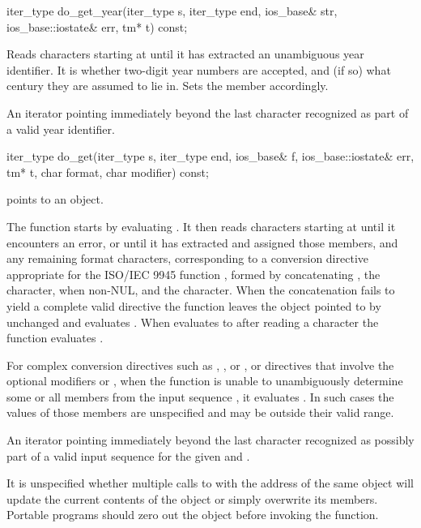 %
\begin{itemdecl}
iter_type do_get_year(iter_type s, iter_type end, ios_base& str,
                      ios_base::iostate& err, tm* t) const;
\end{itemdecl}

\begin{itemdescr}
\pnum
\effects
Reads characters starting at 
until it has extracted an unambiguous year identifier.
It is
 whether
two-digit year numbers are accepted,
and (if so) what century they are assumed to lie in.
Sets the
member accordingly.

\pnum
\returns
An iterator pointing immediately beyond the last character recognized
as part of a valid year identifier.
\end{itemdescr}

%
\begin{itemdecl}
iter_type do_get(iter_type s, iter_type end, ios_base& f,
                 ios_base::iostate& err, tm* t, char format, char modifier) const;
\end{itemdecl}

\begin{itemdescr}
\pnum
\expects
{} points to an object.

\pnum
\effects
The function starts by evaluating
. It
then reads characters starting at  until it encounters an error, or
until it has extracted and assigned those  members, and any
remaining format characters, corresponding to a conversion directive
appropriate for the ISO/IEC 9945 function , formed by
concatenating , the  character,
when non-NUL, and the 
character. When the concatenation fails to yield a complete valid
directive the function leaves the object pointed to by  unchanged and
evaluates . When 
evaluates to  after reading a character the function evaluates
.

\pnum
For complex conversion directives such as ,
, or , or directives
that involve the optional modifiers  or ,
when the function is unable
to unambiguously determine some or all  members from the input
sequence , it evaluates .
In such cases the values of those  members are unspecified
and may be outside their valid range.

\pnum
\returns
An iterator pointing immediately beyond the last character
recognized as possibly part of a valid input sequence for the given
 and .

\pnum
\remarks
It is unspecified whether multiple calls to
 with the
address of the same  object will update the current contents of
the object or simply overwrite its members. Portable programs should zero
out the object before invoking the function.
\end{itemdescr}

